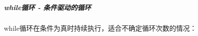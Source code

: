 \begin{Shaded}
\begin{Highlighting}[]
\OperatorTok{=}\NormalTok{ [}\OperatorTok{,} \OperatorTok{,} \OperatorTok{,} \OperatorTok{,} \OperatorTok{,} \OperatorTok{,} \OperatorTok{,} \NormalTok{]}\OperatorTok{;}
\OperatorTok{=} \OperatorTok{;}
\NormalTok{(}\OperatorTok{,}\OperatorTok{;}
\end{Highlighting}
\end{Shaded}

\subparagraph{while循环 - 条件驱动的循环}\label{whileux5faaux73af---ux6761ux4ef6ux9a71ux52a8ux7684ux5faaux73af}

while循环在条件为真时持续执行，适合不确定循环次数的情况：

